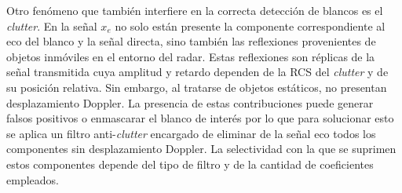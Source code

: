 	Otro fenómeno que también interfiere en la correcta detección de blancos es el \textit{clutter}. En la señal $x_e$ no solo están presente la componente correspondiente al eco del blanco y la señal directa, sino también las reflexiones provenientes de objetos inmóviles en el entorno del radar. Estas reflexiones son réplicas de la señal transmitida cuya amplitud y retardo dependen de la RCS del \textit{clutter} y de su posición relativa. Sin embargo, al tratarse de objetos estáticos, no presentan desplazamiento Doppler. La presencia de estas contribuciones puede generar falsos positivos o enmascarar el blanco de interés por lo que
	para solucionar esto se aplica un filtro anti-\textit{clutter} encargado de eliminar de la señal eco todos los componentes sin desplazamiento Doppler. La selectividad con la que se suprimen estos componentes depende del tipo de filtro y de la cantidad de coeficientes empleados.



